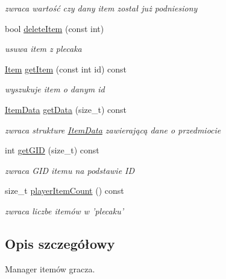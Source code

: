 \begin{DoxyCompactItemize}
\begin{DoxyCompactList}\small\item\em zwraca wartość czy dany item został już podniesiony \end{DoxyCompactList}\item 
bool \hyperlink{class_item_manager_af9d62b0fb7a8a4d44ad5707be5451bfe}{delete\-Item} (const int)
\begin{DoxyCompactList}\small\item\em usuwa item z plecaka \end{DoxyCompactList}\item 
\hyperlink{struct_item}{Item} \hyperlink{class_item_manager_a670709d080a73fdb1872eb3790945325}{get\-Item} (const int id) const 
\begin{DoxyCompactList}\small\item\em wyszukuje item o danym id \end{DoxyCompactList}\item 
\hyperlink{struct_item_data}{Item\-Data} \hyperlink{class_item_manager_a81a09c9a689b40f8fe4d2d422fa5a4da}{get\-Data} (size\-\_\-t) const 
\begin{DoxyCompactList}\small\item\em zwraca strukture \hyperlink{struct_item_data}{Item\-Data} zawierającą dane o przedmiocie \end{DoxyCompactList}\item 
\hypertarget{class_item_manager_aac4440e4b21628d5e993f9f69411e675}{int \hyperlink{class_item_manager_aac4440e4b21628d5e993f9f69411e675}{get\-G\-I\-D} (size\-\_\-t) const }\label{class_item_manager_aac4440e4b21628d5e993f9f69411e675}

\begin{DoxyCompactList}\small\item\em zwraca G\-I\-D itemu na podstawie I\-D \end{DoxyCompactList}\item 
\hypertarget{class_item_manager_ac5660480a58cf8613abb70ce3aefcf30}{size\-\_\-t \hyperlink{class_item_manager_ac5660480a58cf8613abb70ce3aefcf30}{player\-Item\-Count} () const }\label{class_item_manager_ac5660480a58cf8613abb70ce3aefcf30}

\begin{DoxyCompactList}\small\item\em zwraca liczbe itemów w 'plecaku' \end{DoxyCompactList}\end{DoxyCompactItemize}


\subsection{Opis szczegółowy}
Manager itemów gracza. 

